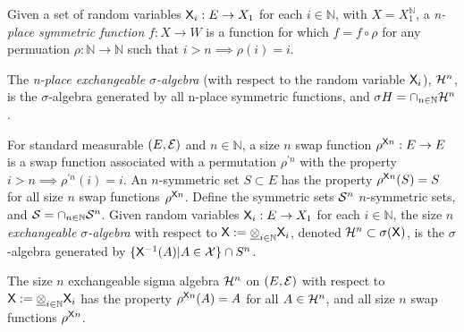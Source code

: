 \begin{definition}\label{def:exchange_sig_alb}
Given a set of random variables $\mathsf{X}_i:E\to X_1$ for each $i\in \mathbb{N}$, with $X=X_1^{\mathbb{N}}$, a \emph{n-place symmetric function} $f:X\to W$ is a function for which $f = f\circ \rho$ for any permuation $\rho:\mathbb{N}\to\mathbb{N}$ such that $i>n\implies\rho(i)=i$. 

The \emph{n-place exchangeable $\sigma$-algebra} (with respect to the random variable $\mathsf{X}_i$), $\mathcal{H}^n$, is the $\sigma$-algebra generated by all n-place symmetric functions, and $\sigma{H}=\cap_{n\in \mathbb{N}} \mathcal{H}^n$. 

For standard measurable $(E,\mathcal{E})$ and $n\in \mathbb{N}$, a size $n$ swap function $\rho^{\mathsf{X}n}:E\to E$ is a swap function associated with a permutation $\rho^{\prime n}$ with the property $i>n\implies \rho^{\prime n}(i)=i$. An $n$-symmetric set $S\subset E$ has the property $\rho^{\mathsf{X}n}(S)=S$ for all size $n$ swap functions $\rho^{\mathsf{X}n}$. Define the symmetric sets $\mathcal{S}^n$ $n$-symmetric sets, and $\mathcal{S}=\cap_{n\in\mathbb{N}} \mathcal{S}^n$. Given random variables $\mathsf{X}_i:E\to X_1$ for each $i\in\mathbb{N}$, the size $n$ \emph{exchangeable $\sigma$-algebra} with respect to $\mathsf{X}:=\underline{\otimes}_{i\in\mathbb{N}}\mathsf{X}_i$, denoted $\mathcal{H}^n\subset\sigma(\mathsf{X})$, is the $\sigma$-algebra generated by $\{\mathsf{X}^{-1}(A)|A\in\mathcal{X}\}\cap S^n$.

\end{definition}

\begin{lemma}
The size $n$ exchangeable sigma algebra $\mathcal{H}^n$ on $(E,\mathcal{E})$ with respect to $\mathsf{X}:=\underline{\otimes}_{i\in\mathbb{N}}\mathsf{X}_i$ has the property $\rho^{\mathsf{X}n}(A)=A$ for all $A\in \mathcal{H}^n$, and all size $n$ swap functions $\rho^{\mathsf{X}n}$.
\end{lemma}


